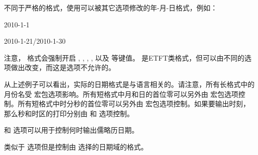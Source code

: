 \begin{optionlist}
\begin{valuelist}
不同于严格的格式，使用可以被其它选项修改的年-月-日格式，例如：\par
2010-1-1\par
2010-1-21/2010-1-30
\end{valuelist}
%
注意， 格式会强制开启 , , , ,  以及  等键值。 是ETFT类格式，但可以由不同的选项做出改变，而这是选项不允许的。

从上述例子可以看出，实际的日期格式是与语言相关的。请注意，所有长格式中的月份名受  宏包选项影响。所有短格式中月和日的首位零可以另外由  宏包选项控制。所有短格式中时分秒的首位零可以另外由  宏包选项控制。如果要输出时刻，那么秒和时区的打印分别由  和  选项控制。


 和  选项可以用于控制何时输出儒略历日期。


类似于  选项但是控制由  选择的日期域的格式。



\end{optionlist}
